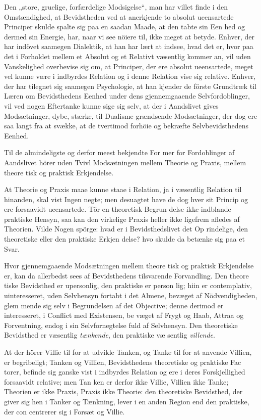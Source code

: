 \documentclass[12pt,a4paper]{article}
\newcommand{\opage}[1]{\marginnote{\footnotesize\textit{[#1]}}}
\begin{document}
Den „store, gruelige, forfærdelige Modsigelse“, man
har villet finde i den Omstændighed, at Bevidstheden ved
at anerkjende to absolut ueensartede Principer skulde
spalte sig paa en saadan Maade, at den tabte sin Een\-%
hed og dermed sin Energie, har, naar vi see nöiere til,
ikke meget at betyde. Enhver, der har indövet saamegen
Dialektik, at han har lært at indsee, hvad det er, hvor\-%
paa det i Forholdet mellem et Absolut og et Relativt
væsentlig kommer an, vil uden Vanskelighed overbevise
sig om, at Principer, der ere absolut ueensartede, meget
vel kunne være i indbyrdes Relation og i denne Relation
vise sig relative. Enhver, der har tilegnet sig saamegen
\opage{66}Psychologie, at han kjender de förste Grundtræk til Læren
om Bevidsthedens Eenhed under dens gjennemgaaende
Selvfordoblinger, vil ved nogen Eftertanke kunne sige sig
selv, at der i Aandslivet gives Modsætninger, dybe, stærke,
til Dualisme grændsende Modsætninger, der dog ere saa
langt fra at svække, at de tvertimod forhöie og bekræfte
Selvbevidsthedens Eenhed.

Til de almindeligste og derfor meest bekjendte For\-%
mer for Fordoblinger af Aandslivet hörer uden Tvivl
Modsætningen mellem Theorie og Praxis, mellem theore\-%
tisk og praktisk Erkjendelse.

At Theorie og Praxis maae kunne staae i Relation,
ja i væsentlig Relation til hinanden, skal vist Ingen
negte; men desuagtet have de dog hver sit Princip og
ere forsaavidt ueensartede. Tör en theoretisk Begrun\-%
delse ikke indblande praktiske Hensyn, saa kan den
virkelige Praxis heller ikke ligefrem afledes af Theorien.
Vilde Nogen spörge: hvad er i Bevidsthedslivet det Op\-%
rindelige, den theoretiske eller den praktiske Erkjen\-%
delse? hvo skulde da betænke sig paa et Svar.

Hvor gjennemgaaende Modsætningen mellem theore\-%
tisk og praktisk Erkjendelse er, kan da allerbedst sees
af Bevidsthedens tilsvarende Forvandling. Den theore\-%
tiske Bevidsthed er upersonlig, den praktiske er person\-%
lig; hiin er contemplativ, uinteresseret, uden Selvhensyn
fortabt i det Almene, bevæget af Nödvendigheden, glem\-%
mende sig selv i Begrundelsen af det Objective; denne
derimod er interesseret, i Conflict med Existensen, be\-%
væget af Frygt og Haab, Attraa og Forventning, endog
i sin Selvfornegtelse fuld af Selvhensyn. Den theoretiske
Bevidsthed er væsentlig \emph{tænkende}, den praktiske væ\-%
sentlig \emph{villende}.

At der hörer Villie til for at udvikle Tanken, og
Tanke til for at anvende Villien, er begribeligt; Tanken
og Villien, Bevidsthedens theoretiske og praktiske Fac\-%
torer, befinde sig ganske vist i indbyrdes Relation og
\opage{67}ere i deres Forskjellighed forsaavidt relative; men Tan\-%
ken er derfor ikke Villie, Villien ikke Tanke; Theorien
er ikke Praxis, Praxis ikke Theorie: den theoretiske
Bevidsthed, der giver sig hen i Tanker og Tænkning,
lever i en anden Region end den praktiske, der con\-%
centrerer sig i Forsæt og Villie.
\end{document}
